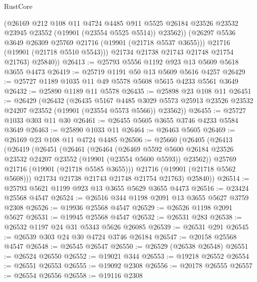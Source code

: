 \begin{lexlean}{RustCore}
\begin{coremodule}
              (@26169
                @212
                @108
                @11
                @4724
                @4485
                @911
                @5525
                @26184
                @23526
                @23532
                @23945
                @23552
                (@19901 (@23554 @5525 @5514))
                @23562))
            (@26297 @5536 @3649 @26309 @25769 @21716 (@19901 (@21718 @5537 @3655)))
            @21716
            (@19901 (@21718 @5510 @5543)))
          @21734
          @21738
          @21743
          @21748
          @21754
          @21763)
        @25840))
@26413 := @25793 @5556 @1192 @923 @13 @5609 @5618 @3655 @4473
@26419 := @25719 @1191 @50 @13 @5609 @5616 @4257
@26429 := @25727 @1189 @1035 @11 @49 @5578 @5608 @5615 @4233 @5561 @3649
@26432 := @25890 @1189 @11 @5578
@26435 := @25898 @23 @108 @11
@26451 := @26429
    (@26432
      (@26435
        @5167
        @4485
        @3029
        @5573
        @25913
        @23526
        @23532
        @24207
        @23552
        (@19901 (@23554 @5573 @5566))
        @23562))
@26455 := @25727 @1033 @303 @11 @30
@26461 := @26455 @5605 @3655 @3746 @4233 @5584 @3649
@26463 := @25890 @1033 @11
@26464 := @26463 @5605
@26469 := @26169 @23 @108 @11 @4724 @4485
@26506 := @25660
    (@26405
      (@26413
        (@26419
          (@26451
            (@26461
              (@26464
                (@26469
                  @5592
                  @5600
                  @26184
                  @23526
                  @23532
                  @24207
                  @23552
                  (@19901 (@23554 @5600 @5593))
                  @23562))
              @25769
              @21716
              (@19901 (@21718 @5585 @3655)))
            @21716
            (@19901 (@21718 @5562 @5608)))
          @21734
          @21738
          @21743
          @21748
          @21754
          @21763)
        @25840))
@26514 := @25793 @5621 @1199 @923 @13 @3655 @5629 @3655 @4473
@26516 := @23424 @25568 @4547
@26524 := @26516 @344 @1198 @2091 @13 @3655 @5627 @3759 @2308
@26526 := @19936 @25568 @4547
@26529 := @26526 @1198 @2091 @5627
@26531 := @19945 @25568 @4547
@26532 := @26531 @283
@26538 := @26532 @1197 @24 @31 @5343 @5626 @26085
@26539 := @26531 @291
@26545 := @26539 @303 @24 @30 @4724 @3746 @26184
@26547 := @20158 @25568 @4547
@26548 := @26545 @26547
@26550 := @26529 (@26538 @26548)
@26551 := @26524 @26550
@26552 := @19021 @344
@26553 := @19218 @26552
@26554 := @26551 @26553
@26555 := @19092 @2308
@26556 := @20178 @26555
@26557 := @26554 @26556
@26558 := @19116 @2308

\end{coremodule}
\end{lexlean}
